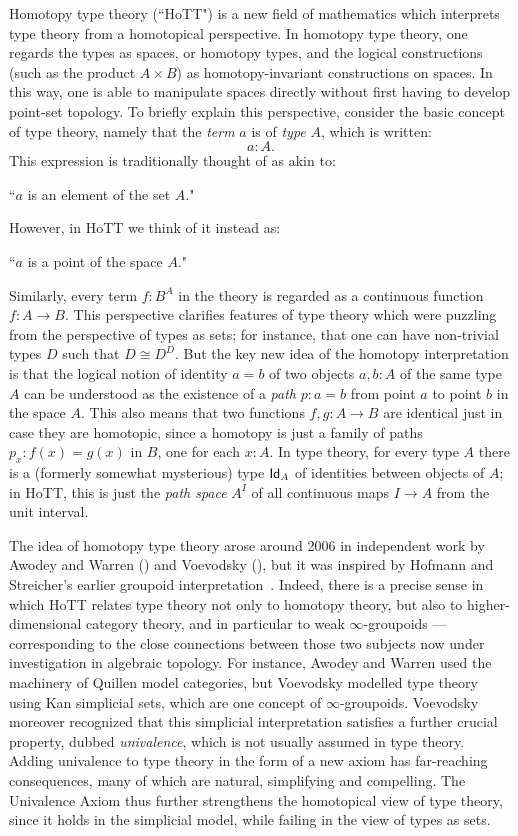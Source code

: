 {Homotopy type theory (``HoTT") is a new field of mathematics which interprets type theory from a homotopical perspective.
In homotopy type theory, one regards the types as spaces, or homotopy types, and the logical constructions (such as the product $A\times B$) as homotopy-invariant constructions on spaces.   In this way, one is able to manipulate spaces directly without first having to develop point-set topology.
To briefly explain this perspective, consider the basic concept of type theory, namely that
the \emph{term} $a$ is of \emph{type} $A$, which is written:
$$
  a:A.
$$
This expression is traditionally thought of as akin to:
\begin{center}
``$a$ is an element of the set $A$."
\end{center}
However, in HoTT we think of it instead as:
\begin{center}
``$a$ is a point of the space $A$."
\end{center}
Similarly, every term $f : B^A$ in the theory is regarded as a continuous function $f : A \to B$. This perspective clarifies features of type theory which were puzzling
from the perspective of types as sets; for instance, that one can have non-trivial types $D$ such that $D\cong D^D$.  But the key new idea of the homotopy interpretation is that the logical notion of identity $a = b$ of two objects $a, b: A$ of the same type $A$ can be understood as the existence of a \emph{path} $p : a = b$ from point $a$ to point $b$ in the space $A$.  This also means that two functions $f, g: A\to B$ are identical just in case they are homotopic, since a homotopy is just a family of paths $p_x: f(x) = g(x)$ in $B$, one for each $x:A$.  In type theory, for every type $A$ there is a (formerly somewhat mysterious) type ${{\sf Id}}_{A}$ of identities between objects of $A$; in HoTT, this is just the \emph{path space} $A^I$ of all continuous maps $I\to A$ from the unit interval.  

The idea of homotopy type theory arose around 2006 in independent work by Awodey and Warren (\cite{AW}) and Voevodsky (\cite{VV}), but it was inspired by 
Hofmann and Streicher's earlier groupoid interpretation~\cite{HofmannM:gromtt}.  Indeed, there is a precise sense in which HoTT relates type theory not only to homotopy theory, but also to  higher-dimensional category theory, and in particular to weak $\infty$-groupoids --- corresponding to the close connections between those two subjects now under investigation in algebraic topology.  For instance, Awodey and Warren used the machinery of Quillen model categories, but Voevodsky  modelled type theory using Kan simplicial sets, which are one concept of $\infty$-groupoids.  Voevodsky moreover recognized that this simplicial interpretation satisfies a further crucial property, dubbed \emph{univalence},  which is not usually assumed in type theory.  Adding univalence  to type theory in the form of a new axiom has far-reaching consequences, many of which are natural, simplifying and compelling.  The Univalence Axiom thus further strengthens the homotopical view of type theory, since it holds in the simplicial model, while failing in the view of types as sets.  

}
